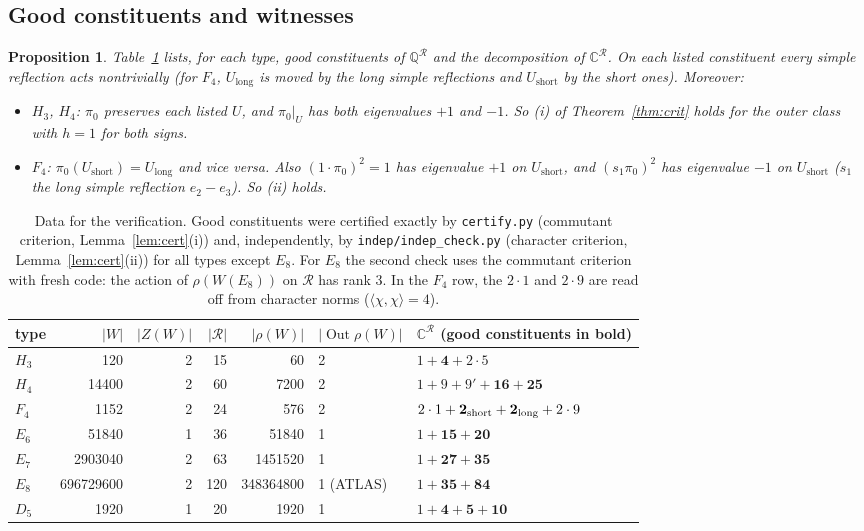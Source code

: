 \documentclass[11pt]{amsart}
\newtheorem{proposition}[theorem]{Proposition}
\theoremstyle{definition}
\newcommand{\Q}{\mathbb{Q}}
\newcommand{\C}{\mathbb{C}}
\newcommand{\R}{\mathcal{R}}
\newcommand{\Out}{\operatorname{Out}}
\begin{document}
\subsection{Good constituents and witnesses}
\begin{proposition}\label{prop:data}
Table~\ref{tab:data} lists, for each type, good constituents of $\Q^\R$ and the decomposition of $\C^\R$. On each
listed constituent every simple reflection acts nontrivially (for $F_4$, $U_{\mathrm{long}}$ is moved by the long
simple reflections and $U_{\mathrm{short}}$ by the short ones). Moreover:
\begin{itemize}
\item $H_3$, $H_4$: $\pi_0$ preserves each listed $U$, and $\pi_0|_U$ has both eigenvalues $+1$ and $-1$.
So (i) of Theorem~\ref{thm:crit} holds for the outer class with $h=1$ for both signs.
\item $F_4$: $\pi_0(U_{\mathrm{short}})=U_{\mathrm{long}}$ and vice versa. Also $(1\cdot\pi_0)^2=1$ has
eigenvalue $+1$ on $U_{\mathrm{short}}$, and $(s_1\pi_0)^2$ has eigenvalue $-1$ on $U_{\mathrm{short}}$
($s_1$ the long simple reflection $e_2-e_3$). So (ii) holds.
\end{itemize}
\end{proposition}

\begin{table}[ht]
\centering\small
\begin{tabular}{lrrrrll}
\toprule
type & $|W|$ & $|Z(W)|$ & $|\R|$ & $|\rho(W)|$ & $|\Out\rho(W)|$ & $\C^\R$ (good constituents in bold)\\
\midrule
$H_3$ & 120 & 2 & 15 & 60 & 2 & $1+\mathbf 4+2\cdot 5$\\
$H_4$ & 14400 & 2 & 60 & 7200 & 2 & $1+9+9'+\mathbf{16}+\mathbf{25}$\\
$F_4$ & 1152 & 2 & 24 & 576 & 2 & $2\cdot1+\mathbf{2}_{\rm short}+\mathbf 2_{\rm long}+2\cdot 9$\\
$E_6$ & 51840 & 1 & 36 & 51840 & 1 & $1+\mathbf{15}+\mathbf{20}$\\
$E_7$ & 2903040 & 2 & 63 & 1451520 & 1 & $1+\mathbf{27}+\mathbf{35}$\\
$E_8$ & 696729600 & 2 & 120 & 348364800 & 1 (ATLAS) & $1+\mathbf{35}+\mathbf{84}$\\
\midrule
$D_5$ & 1920 & 1 & 20 & 1920 & 1 & $1+\mathbf4+\mathbf5+\mathbf{10}$\\
\bottomrule
\end{tabular}
\caption{Data for the verification. Good constituents were certified exactly by \texttt{certify.py} (commutant
criterion, Lemma~\ref{lem:cert}(i)) and, independently, by \texttt{indep/indep\_check.py} (character criterion,
Lemma~\ref{lem:cert}(ii)) for all types except $E_8$. For $E_8$ the second check uses the commutant criterion with
fresh code: the action of $\rho(W(E_8))$ on $\R$ has rank $3$. In the $F_4$ row, the $2\cdot 1$ and $2\cdot9$ are
read off from character norms ($\langle\chi,\chi\rangle=4$).}
\label{tab:data}
\end{table}
\end{document}
